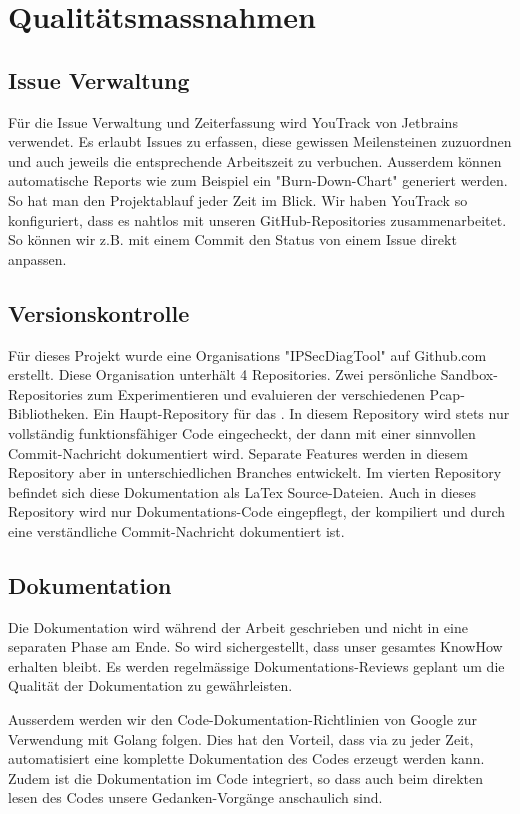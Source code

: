 \section{Qualitätsmassnahmen}
\label{sec:Qualitätsmassnahmen}

\subsection{Issue Verwaltung}
Für die Issue Verwaltung und Zeiterfassung wird YouTrack von Jetbrains verwendet. Es erlaubt Issues zu erfassen, diese gewissen Meilensteinen zuzuordnen und auch jeweils die entsprechende Arbeitszeit zu verbuchen. Ausserdem können automatische Reports wie zum Beispiel ein "Burn-Down-Chart" generiert werden. So hat man den Projektablauf jeder Zeit im Blick. Wir haben YouTrack so konfiguriert, dass es nahtlos mit unseren GitHub-Repositories zusammenarbeitet. So können wir z.B. mit einem Commit den Status von einem Issue direkt anpassen.

\subsection{Versionskontrolle}
Für dieses Projekt wurde eine Organisations "IPSecDiagTool" auf Github.com erstellt. Diese Organisation unterhält 4 Repositories. Zwei persönliche Sandbox-Repositories zum Experimentieren und evaluieren der verschiedenen Pcap-Bibliotheken. Ein Haupt-Repository für das \tool . In diesem Repository wird stets nur vollständig funktionsfähiger Code eingecheckt, der dann mit einer sinnvollen Commit-Nachricht dokumentiert wird. Separate Features werden in diesem Repository aber in unterschiedlichen Branches entwickelt.
Im vierten Repository befindet sich diese Dokumentation als LaTex Source-Dateien. Auch in dieses Repository wird nur Dokumentations-Code eingepflegt, der kompiliert und durch eine verständliche Commit-Nachricht dokumentiert ist.

\subsection{Dokumentation}
Die Dokumentation wird während der Arbeit geschrieben und nicht in eine separaten Phase am Ende. So wird sichergestellt, dass unser gesamtes KnowHow erhalten bleibt.
Es werden regelmässige Dokumentations-Reviews geplant um die Qualität der Dokumentation zu gewährleisten.

Ausserdem werden wir den Code-Dokumentation-Richtlinien von Google zur Verwendung mit Golang folgen. Dies hat den Vorteil, dass via  zu jeder Zeit, automatisiert eine komplette Dokumentation des Codes erzeugt werden kann. Zudem ist die Dokumentation im Code integriert, so dass auch beim direkten lesen des Codes unsere Gedanken-Vorgänge anschaulich sind.


